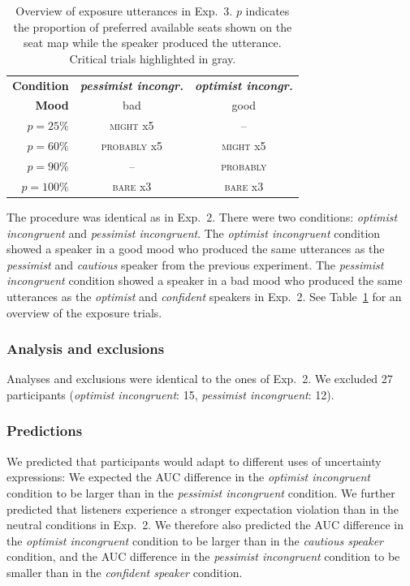 \begin{table}
\centering
\begin{tabular}{r|c | c }
\toprule 
     \textbf{Condition} & \textit{\textbf{pessimist incongr.}} & \textit{\textbf{optimist incongr.}} \\
     \textbf{Mood} & bad  & good  \\ \midrule
     $p=25\%$ & \textsc{might} x5 & -- \\
     \cellcolor{LightGray} $p=60\%$ &  \cellcolor{LightGray} \textsc{probably} x5 & \cellcolor{LightGray} \textsc{might} x5 \\
     $p=90\%$ & -- &  \textsc{probably}  \\
     $p=100\%$ & {\textsc{bare} x3} & {\textsc{bare} x3} \\
     \bottomrule
\end{tabular}
\caption{Overview of exposure utterances in Exp.~3. $p$ indicates the proportion of preferred available seats shown on the seat map while the speaker produced the utterance. Critical trials highlighted in gray.\label{tbl:exposure-overview-exp3}}
\end{table}


The procedure was identical as in Exp.~2. There were two conditions: \textit{optimist incongruent} and \textit{pessimist incongruent}. The \textit{optimist incongruent} condition showed a speaker in a good mood who produced the same utterances as the \textit{pessimist} and \textit{cautious} speaker from the previous experiment. The \textit{pessimist incongruent} condition showed a speaker in a bad mood who produced the same utterances as the \textit{optimist} and \textit{confident} speakers in Exp.~2. See Table~\ref{tbl:exposure-overview-exp3} for an overview of the exposure trials.

\subsubsection{Analysis and exclusions}

Analyses and exclusions were identical to the ones of Exp.~2. We excluded 27 participants (\textit{optimist incongruent}: 15, \textit{pessimist incongruent}: 12).

\subsubsection{Predictions}

We predicted that participants would adapt to different uses of uncertainty expressions: We expected the AUC difference in the \textit{optimist incongruent} condition to be larger than in the \textit{pessimist incongruent} condition. We further predicted that listeners experience a stronger expectation violation than in the neutral conditions in Exp.~2. We therefore also predicted the AUC difference in the \textit{optimist incongruent} condition to be larger than in the \textit{cautious speaker} condition, and the AUC difference in the \textit{pessimist incongruent} condition to be smaller than in the \textit{confident speaker} condition.

